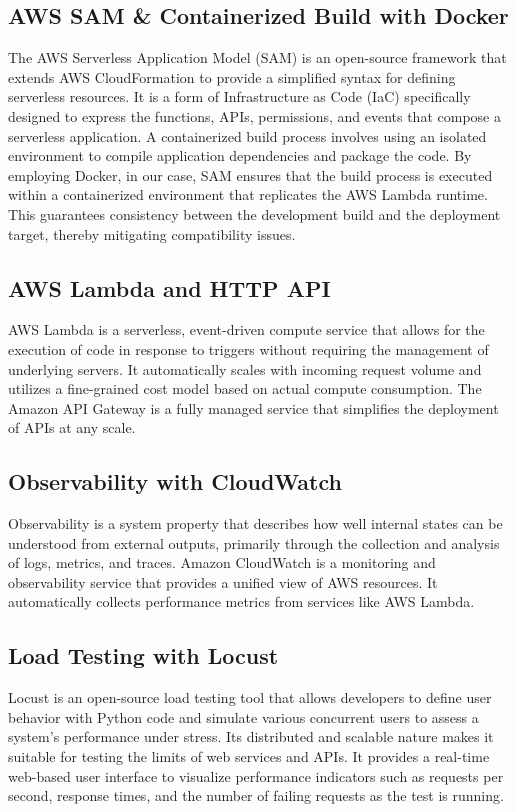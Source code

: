 \documentclass[11pt,a4paper]{article}
\begin{document}
\subsection{AWS SAM \& Containerized Build with Docker}
The AWS Serverless Application Model (SAM) is an open-source framework that extends AWS CloudFormation to provide a simplified syntax for defining serverless resources. It is a form of Infrastructure as Code (IaC) specifically designed to express the functions, APIs, permissions, and events that compose a serverless application. A containerized build process involves using an isolated environment to compile application dependencies and package the code. By employing Docker, in our case, SAM ensures that the build process is executed within a containerized environment that replicates the AWS Lambda runtime. This guarantees consistency between the development build and the deployment target, thereby mitigating compatibility issues.

\subsection{AWS Lambda and HTTP API}
AWS Lambda is a serverless, event-driven compute service that allows for the execution of code in response to triggers without requiring the management of underlying servers. It automatically scales with incoming request volume and utilizes a fine-grained cost model based on actual compute consumption. The Amazon API Gateway is a fully managed service that simplifies the deployment of APIs at any scale.

\subsection{Observability with CloudWatch}
Observability is a system property that describes how well internal states can be understood from external outputs, primarily through the collection and analysis of logs, metrics, and traces. Amazon CloudWatch is a monitoring and observability service that provides a unified view of AWS resources. It automatically collects performance metrics from services like AWS Lambda.

\subsection{Load Testing with Locust}
Locust is an open-source load testing tool that allows developers to define user behavior with Python code and simulate various concurrent users to assess a system's performance under stress. Its distributed and scalable nature makes it suitable for testing the limits of web services and APIs. It provides a real-time web-based user interface to visualize performance indicators such as requests per second, response times, and the number of failing requests as the test is running.
\end{document}
